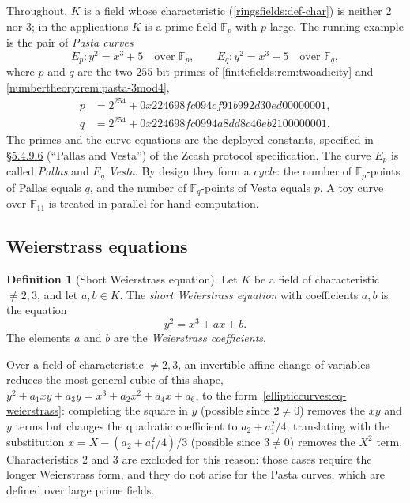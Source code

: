 \documentclass[11pt,a4paper]{article}
\theoremstyle{definition}
\newtheorem{definition}[theorem]{Definition}
\theoremstyle{remark}
\newcommand{\F}{\ensuremath{\mathbb{F}}}
\newcommand{\Fp}{\ensuremath{\mathbb{F}_{p}}}
\newcommand{\Fq}{\ensuremath{\mathbb{F}_{q}}}
\begin{document}
Throughout, \(K\) is a field whose characteristic
(\cref{ringsfields:def-char}) is neither \(2\) nor \(3\); in the
applications \(K\) is a prime field \(\Fp\) with \(p\) large. The running
example is the pair of \emph{Pasta curves}
\[
  E_p : y^2 = x^3 + 5 \quad\text{over } \Fp, \qquad
  E_q : y^2 = x^3 + 5 \quad\text{over } \Fq,
\]
where \(p\) and \(q\) are the two \(255\)-bit primes of
\cref{finitefields:rem:twoadicity} and
\cref{numbertheory:rem:pasta-3mod4},
\begin{align*}
  p &= 2^{254} + 0x224698fc094cf91b992d30ed00000001,\\
  q &= 2^{254} + 0x224698fc0994a8dd8c46eb2100000001 .
\end{align*}
The primes and the curve equations are the deployed constants, specified
in \href{https://zips.z.cash/protocol/protocol.pdf\#pallasandvesta}{\S5.4.9.6}
(``Pallas and Vesta'') of the Zcash protocol specification. The curve
\(E_p\) is called \emph{Pallas} and \(E_q\) \emph{Vesta}. By design they
form a \emph{cycle}: the number of \(\Fp\)-points of Pallas equals \(q\),
and the number of \(\Fq\)-points of Vesta equals \(p\). A toy curve over
\(\F_{11}\) is treated in parallel for hand computation.

\subsection{Weierstrass equations}\label{ellipticcurves:subsec-weierstrass}

\begin{definition}[Short Weierstrass equation]
\label{ellipticcurves:def-weierstrass}
Let \(K\) be a field of characteristic \(\neq 2, 3\), and let
\(a, b \in K\). The \emph{short Weierstrass equation} with coefficients
\(a, b\) is the equation
\begin{equation}\label{ellipticcurves:eq-weierstrass}
  y^2 = x^3 + a x + b .
\end{equation}
The elements \(a\) and \(b\) are the \emph{Weierstrass coefficients}.
\end{definition}

Over a field of characteristic \(\neq 2, 3\), an invertible affine
change of variables reduces the most general cubic of this shape,
\(y^2 + a_1 xy + a_3 y = x^3 + a_2 x^2 + a_4 x + a_6\), to the
form~\eqref{ellipticcurves:eq-weierstrass}: completing the square in
\(y\) (possible since \(2 \neq 0\)) removes the \(xy\) and \(y\) terms
but changes the quadratic coefficient to \(a_2+a_1^2/4\); translating
with the substitution \(x=X-(a_2+a_1^2/4)/3\) (possible since
\(3 \neq 0\)) removes the \(X^2\) term. Characteristics \(2\) and \(3\)
are excluded for this reason: those cases require the longer Weierstrass
form, and they do not arise for the Pasta curves, which are defined over
large prime fields.
\end{document}
